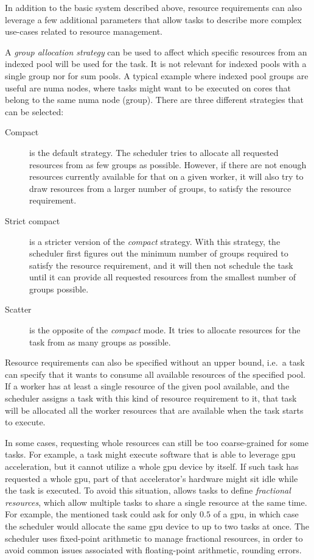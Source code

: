 In addition to the basic system described above, resource requirements can also leverage a few
additional parameters that allow tasks to describe more complex use-cases related to resource
management.

A \emph{group allocation strategy} can be used to affect which specific resources from an indexed pool will
be used for the task. It is not relevant for indexed pools with a single group nor for sum pools. A
typical example where indexed pool groups are useful are \gls{numa} nodes, where tasks
might want to be executed on cores that belong to the same \gls{numa} node (group). There are three
different strategies that can be selected:
\begin{description}
	\item [Compact] is the default strategy. The scheduler tries to allocate all requested
	      resources from as few groups as possible. However, if there are not enough resources currently
	      available for that on a given worker, it will also try to draw resources from a larger number of
	      groups, to satisfy the resource requirement.
	\item [Strict compact] is a stricter version of the \emph{compact} strategy. With this
	      strategy, the scheduler first figures out the minimum number of groups required to satisfy the
	      resource requirement, and it will then not schedule the task until it can provide all requested
	      resources from the smallest number of groups possible.
	\item [Scatter] is the opposite of the \emph{compact} mode. It tries to allocate resources
	      for the task from as many groups as possible.
\end{description}

Resource requirements can also be specified without an upper bound, i.e.\ a task can specify that
it wants to consume all available resources of the specified pool. If a worker has at least a
single resource of the given pool available, and the scheduler assigns a task with this kind of
resource requirement to it, that task will be allocated all the worker resources that are available
when the task starts to execute.

In some cases, requesting whole resources can still be too coarse-grained for some tasks. For
example, a task might execute software that is able to leverage \gls{gpu}
acceleration, but it cannot utilize a whole \gls{gpu} device by itself. If such task
has requested a whole \gls{gpu}, part of that accelerator's hardware might sit idle
while the task is executed. To avoid this situation, \hyperqueue{} allows tasks to define
\emph{fractional resources}, which allow multiple tasks to share a single resource at the same time.
For example, the mentioned task could ask for only $0.5$ of a
\gls{gpu}, in which case the scheduler would allocate the same
\gls{gpu} device to up to two tasks at once. The scheduler uses fixed-point
arithmetic to manage fractional resources, in order to avoid common issues associated with
floating-point arithmetic, rounding errors.

